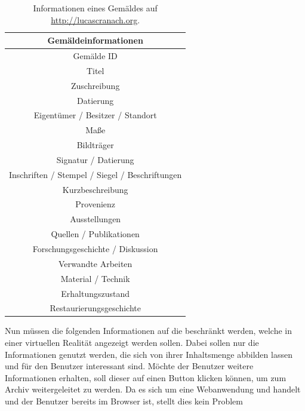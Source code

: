 \documentclass[a4paper,12pt,oneside]{article}
\begin{document}
        \begin{table}[h]
          \begin{center}
          \begin{tabular}{| c |}
            \hline
            \textbf{Gemäldeinformationen} \\ \hline
            Gemälde ID \\ \hline
            Titel \\ \hline
            Zuschreibung \\ \hline
            Datierung \\ \hline
            Eigentümer / Besitzer / Standort \\ \hline
            Maße \\ \hline
            Bildträger \\ \hline
            Signatur / Datierung \\ \hline
            Inschriften / Stempel / Siegel / Beschriftungen \\ \hline
            Kurzbeschreibung \\ \hline
            Provenienz \\ \hline
            Ausstellungen \\ \hline
            Quellen / Publikationen \\ \hline
            Forschungsgeschichte / Diskussion \\ \hline
            Verwandte Arbeiten \\ \hline
            Material / Technik \\ \hline
            Erhaltungszustand \\ \hline
            Restaurierungsgeschichte \\ \hline
          \end{tabular}
          \caption{Informationen eines Gemäldes auf \url{http://lucascranach.org}.\label{tab:gemaeldeinfos}}
          \end{center}
        \end{table}
        Nun müssen die folgenden Informationen auf die beschränkt werden, welche in
        einer virtuellen Realität angezeigt werden sollen. Dabei sollen nur die 
        Informationen genutzt werden, die sich von ihrer Inhaltsmenge abbilden lassen
        und für den Benutzer interessant sind. Möchte der Benutzer weitere
        Informationen erhalten, soll dieser auf einen Button klicken können, um
        zum Archiv weitergeleitet zu werden. Da es sich um eine Webanwendung und
        handelt und der Benutzer bereits im Browser ist, stellt dies kein Problem 
\end{document}
